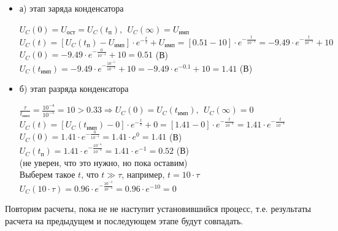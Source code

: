 	\begin{itemize}
\item[] а) этап заряда конденсатора

		$U_C(0) = U_\text{ост} = U_C(t_\text{п}),\ \ U_C(\infty) = U_\text{имп}$\\
		$U_C(t) = [U_C(t_\text{п}) - U_\text{имп}] \cdot e^{-\frac{t}{\tau}} + U_\text{имп} = [0.51 - 10] \cdot e^{-\frac{t}{10^{-4}}} = -9.49 \cdot e^{-\frac{t}{10^{-4}}} + 10$\\
		$U_C(0) = -9.49 \cdot e^{-\frac{0}{10^{-4}}} + 10 = 0.51$ (В)\\
		$U_C(t_\text{имп}) = -9.49 \cdot e^{-\frac{10^{-5}}{10^{-4}}} + 10 = -9.49 \cdot e^{-0.1} + 10 = 1.41$ (В)\\
		
\item[] б) этап разряда конденсатора
	
		$\frac{\tau}{t_\text{имп}} = \frac{10^{-4}}{10^{-5}} = 10 > 0.33 \Rightarrow U_C(0) = U_C(t_\text{имп}),\ \ U_C(\infty) = 0$\\
		$U_C(t) = [U_C(t_\text{имп}) - 0] \cdot e^{-\frac{t}{\tau}} + 0 =  [1.41 - 0] \cdot e^{-\frac{t}{10^{-4}}} = 1.41 \cdot e^{-\frac{t}{10^{-4}}}$\\
		$U_C(0) = 1.41 \cdot e^{-\frac{0}{10^{-4}}} = 1.41 \cdot e^0 = 1.41$ (В)\\
		$U_C(t_\text{п}) = 1.41 \cdot e^{-\frac{10^{-4}}{10^{-4}}} = 1.41 \cdot e^{-1} = 0.52$ (В)\\
		(не уверен, что это нужно, но пока оставим)\\
		Выберем такое $t$, что $t \gg \tau$, например, $t = 10 \cdot \tau$ \\
		$U_C( 10 \cdot \tau) = 0.96 \cdot e^{-\frac{10^{-3}}{10^{-4}}} = 0.96 \cdot e^{-10} = 0$	
		
\end{itemize}

	Повторим расчеты, пока не не наступит установившийся процесс, т.е. результаты расчета на предыдущем и последующем этапе будут совпадать.		
	
